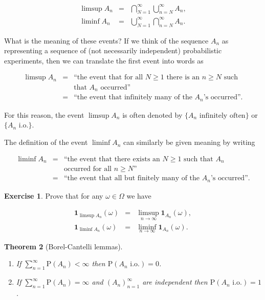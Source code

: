 \documentclass[11pt]{report}
\theoremstyle{plain}
\newtheorem{thm}{Theorem}[chapter]
\theoremstyle{definition}
\newtheorem{xexercise}[thm]{Exercise}
\begin{document}
\begin{eqnarray*}
\limsup A_n &=& \bigcap_{N=1}^\infty \bigcup_{n=N}^\infty A_n, \\
\liminf A_n &=& \bigcup_{N=1}^\infty \bigcap_{n=N}^\infty A_n.
\end{eqnarray*}

\noindent What is the meaning of these events? If we think of
the sequence $A_n$ as representing a sequence of (not
necessarily independent) probabilistic experiments,
then we can translate the first event into words as

\begin{eqnarray*}
\limsup A_n &=& \textrm{``the event that for all $N\ge 1$ there is an $n\ge N$ such} \\
&  & \textrm{that $A_n$ occurred''} \\ &=& \textrm{``the event that infinitely many of the $A_n$'s occurred''.}
\end{eqnarray*}

\noindent For this reason, the event $\limsup A_n$ is often
denoted by $\{ A_n\textrm{ infinitely often}\}$ or
$\{A_n \textrm{ i.o.}\}$.

The definition of the event $\liminf A_n$ can
similarly be given meaning by writing

\begin{eqnarray*}
\liminf A_n &=& \textrm{``the event that there exists an $N\ge 1$ such that $A_n$ } \\
&  & \textrm{occurred for all $n\ge N$''} \\ &=& \textrm{``the event that all but finitely many of the $A_n$'s occurred''.}
\end{eqnarray*}

\begin{xexercise}
Prove that for any $\omega \in \Omega$ we have

\begin{eqnarray*}
\mathbf{1}_{\limsup A_n}(\omega) &=& \limsup_{n\to\infty} \mathbf{1}_{A_n}(\omega), \\
\mathbf{1}_{\liminf A_n}(\omega) &=& \liminf_{n\to\infty} \mathbf{1}_{A_n}(\omega).
\end{eqnarray*}

\end{xexercise}

\begin{thm}[Borel-Cantelli lemmas]

\begin{enumerate}[label=(\roman*)]
\item If $\sum_{n=1}^\infty \mathrm{P}(A_n) < \infty$ then
$\mathrm{P}(A_n\textrm{ i.o.}) = 0$.

\item If $\sum_{n=1}^\infty \mathrm{P}(A_n) = \infty$ and
$(A_n)_{n=1}^\infty$ are independent then
$\mathrm{P}(A_n\textrm{ i.o.}) = 1$.
\end{enumerate}

\end{thm}
\end{document}

